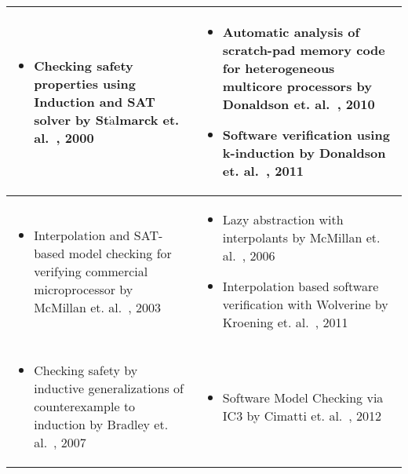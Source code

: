 {\begin{table}[]
\begin{tabular}{p{}|p{}}
  \begin{itemize}
    \item Checking safety properties using Induction and SAT solver by
      St$\mathring{\text{a}}$lmarck et. al.~\cite{fmcad2000}, 2000
   \end{itemize}
   & 
   \begin{itemize}
     \item Automatic analysis of scratch-pad memory code for heterogeneous
       multicore processors by Donaldson et. al.~\cite{tacas10}, 2010
     \item Software verification using k-induction by Donaldson et.
       al.~\cite{sas2011}, 2011
   \end{itemize} \\ \hline
   
   \begin{itemize}
     \item Interpolation and SAT-based model checking for verifying commercial
       microprocessor by McMillan et. al.~\cite{cav03}, 2003
   \end{itemize}
   & 
   \begin{itemize}
     \item Lazy abstraction with interpolants by McMillan et. al.~\cite{cav06}, 2006
     \item Interpolation based software verification with Wolverine by Kroening
       et. al.~\cite{cav11}, 2011
   \end{itemize} \\ \hline
   
   \begin{itemize}
     \item Checking safety by inductive generalizations of counterexample to
       induction by Bradley et. al.~\cite{fmcad07}, 2007
   \end{itemize}
   &
   \begin{itemize}
    \item Software Model Checking via IC3 by Cimatti et. al.~\cite{cav12ic3}, 2012
   \end{itemize} \\ \hline
\bottomrule
\end{tabular}
\end{table}
%
}
